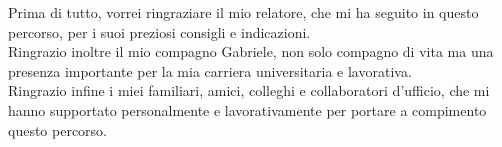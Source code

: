 Prima di tutto, vorrei ringraziare il mio relatore, che mi ha seguito in questo percorso, per i suoi preziosi consigli e indicazioni.
\\Ringrazio inoltre il mio compagno Gabriele, non solo compagno di vita ma una presenza importante per la mia carriera universitaria e lavorativa.
\\Ringrazio infine i miei familiari, amici, colleghi e collaboratori d'ufficio, che mi hanno supportato personalmente e lavorativamente per portare a compimento questo percorso.


